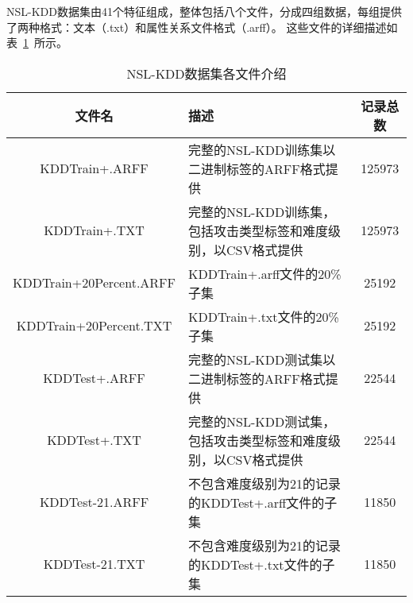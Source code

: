 NSL-KDD数据集由41个特征组成，整体包括八个文件，分成四组数据，每组提供了两种格式：文本（.txt）和属性关系文件格式（.arff）。
这些文件的详细描述如表~\ref{tab:NSLKDDFile}~所示。
\begin{table}[htbp]
	\caption{NSL-KDD数据集各文件介绍}
	\label{tab:NSLKDDFile}
	\begin{tabularx}{\textwidth}{cXc}
		\toprule
		\textbf{文件名}         & \textbf{描述}                                                  & \textbf{记录总数} \\
		\midrule
		KDDTrain+.ARFF          & 完整的NSL-KDD训练集以二进制标签的ARFF格式提供                  & 125973            \\
		KDDTrain+.TXT           & 完整的NSL-KDD训练集，包括攻击类型标签和难度级别，以CSV格式提供 & 125973            \\
		KDDTrain+20Percent.ARFF & KDDTrain+.arff文件的20\%子集                                   & 25192             \\
		KDDTrain+20Percent.TXT  & KDDTrain+.txt文件的20\%子集                                    & 25192             \\
		KDDTest+.ARFF           & 完整的NSL-KDD测试集以二进制标签的ARFF格式提供                  & 22544             \\
		KDDTest+.TXT            & 完整的NSL-KDD测试集，包括攻击类型标签和难度级别，以CSV格式提供 & 22544             \\
		KDDTest-21.ARFF         & 不包含难度级别为21的记录的KDDTest+.arff文件的子集              & 11850             \\
		KDDTest-21.TXT          & 不包含难度级别为21的记录的KDDTest+.txt文件的子集               & 11850             \\
		\bottomrule
	\end{tabularx}
\end{table}

